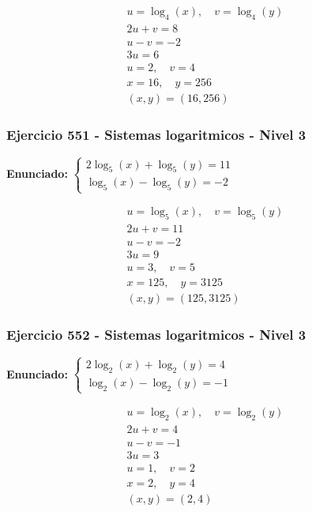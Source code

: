 \documentclass[12pt,a4paper]{article}
\begin{document}
\[
\begin{aligned}
u=\log_{4}\left(x\right),\quad v=\log_{4}\left(y\right)\\
2u+v=8\\
u-v=-2\\
3u=6\\
u=2,\quad v=4\\
x=16,\quad y=256\\
\boxed{(x,y)=(16,256)}
\end{aligned}
\]


\subsubsection*{Ejercicio 551 - Sistemas logaritmicos - Nivel 3}
\textbf{Enunciado:} \(\begin{cases} 2\log_{5}\left(x\right)+\log_{5}\left(y\right)=11\\ \log_{5}\left(x\right)-\log_{5}\left(y\right)=-2\end{cases}\)

\[
\begin{aligned}
u=\log_{5}\left(x\right),\quad v=\log_{5}\left(y\right)\\
2u+v=11\\
u-v=-2\\
3u=9\\
u=3,\quad v=5\\
x=125,\quad y=3125\\
\boxed{(x,y)=(125,3125)}
\end{aligned}
\]


\subsubsection*{Ejercicio 552 - Sistemas logaritmicos - Nivel 3}
\textbf{Enunciado:} \(\begin{cases} 2\log_{2}\left(x\right)+\log_{2}\left(y\right)=4\\ \log_{2}\left(x\right)-\log_{2}\left(y\right)=-1\end{cases}\)

\[
\begin{aligned}
u=\log_{2}\left(x\right),\quad v=\log_{2}\left(y\right)\\
2u+v=4\\
u-v=-1\\
3u=3\\
u=1,\quad v=2\\
x=2,\quad y=4\\
\boxed{(x,y)=(2,4)}
\end{aligned}
\]
\end{document}
